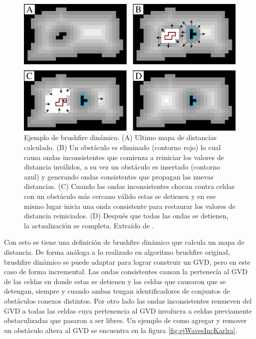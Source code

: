 \begin{figure}[H]
  \center
  \includegraphics[width=1\linewidth]{imagenes/wavesBrushDinClean2Rows.png}
  \caption{Ejemplo de brushfire dinámico. (A) Ultimo mapa de distancias calculado. (B) Un obstáculo es eliminado (contorno rojo) lo cual causa ondas inconsistentes que comienza a reiniciar los valores de distancia inválidos, a su vez un obstáculo es insertado (contorno azul) y generando ondas consistentes que propagan las nuevas distancias. (C) Cuando las ondas inconsistentes chocan contra celdas con un obstáculo más cercano válido estas se detienen y en ese mismo lugar inicia una onda consistente para restaurar los valores de distancia reiniciados. (D) Después que todas las ondas se detienen, la actualización se completa. Extraído de \cite{Lau2013}.}\label{fig:wavesBrushDyn}
\end{figure} 

Con esto se tiene una definición de brushfire dinámico que calcula un mapa de distancia. De forma análoga a lo realizado en algoritmo brushfire original, brushfire dinámico se puede adaptar para lograr construir un GVD, pero en este caso de forma incremental. Las ondas consistentes causan la pertenecía al GVD de las celdas en donde estas se detienen y las celdas que causaron que se detengan, siempre y cuando ambas tengan identificadores de conjuntos de obstáculos conexos distintos. Por otro lado las ondas inconsistentes remueven del GVD a todas las celdas cuya pertenencia al GVD involucra a celdas previamente obstaculizadas que pasaron a ser libres. Un ejemplo de como agregar y remover un obstáculo altera al GVD se encuentra en la figura \ref{fig:ejWavesIncKarlra}. 

